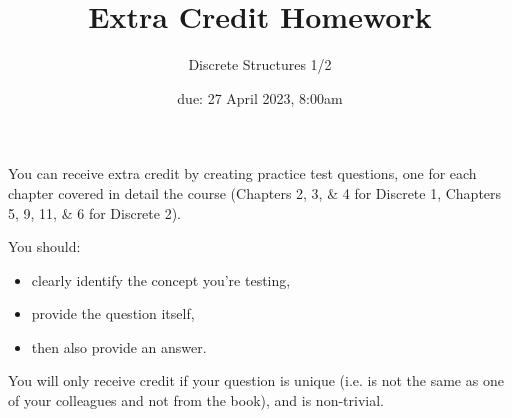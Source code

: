 \documentclass[11pt, oneside]{article}   	%
\title{Extra Credit Homework}
\author{Discrete Structures 1/2}
\date{due: 27 April 2023, 8:00am}							%
\begin{document}
\maketitle

You can receive extra credit by creating practice test questions,  one for each chapter covered in detail the course (Chapters  2, 3, \& 4 for Discrete 1, Chapters 5, 9, 11, \& 6 for Discrete 2).

You should: 
\begin{itemize}
\item clearly identify the concept you're testing, 
\item provide the question itself, 
\item then also provide an answer.
\end{itemize}

You will only receive credit if your question is unique (i.e. is not the same as one of your colleagues and not from the book), 
and is non-trivial.
\end{document}
